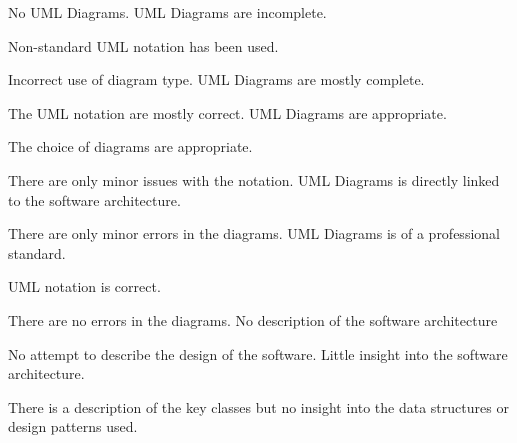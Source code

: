 \documentclass{../../fal_assignment}
\begin{document}
\begin{markingrubric}
	\grade\fail No UML Diagrams.
	\grade UML Diagrams are incomplete.
	\par Non-standard UML notation has been used.
	\par Incorrect use of diagram type.
	\grade UML Diagrams are mostly complete.
	\par The UML notation are mostly correct.
	\grade UML Diagrams are appropriate.
	\par The choice of diagrams are appropriate.
	\par There are only minor issues with the notation.
	\grade UML Diagrams is directly linked to the software architecture.
	\par There are only minor errors in the diagrams.
	\grade UML Diagrams is of a professional standard.
	\par UML notation is correct.
	\par There are no errors in the diagrams.
	\grade\fail No description of the software architecture
	\par No attempt to describe the design of the software.
	\grade Little insight into the software architecture.
	\par There is a description of the key classes but no insight into the data structures or design patterns used.

\end{markingrubric}
\end{document}
